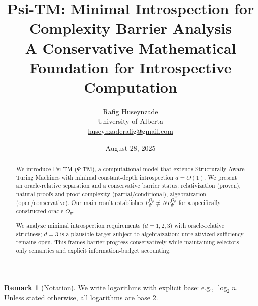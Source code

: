 \documentclass[11pt]{article}
\title{Psi-TM: Minimal Introspection for Complexity Barrier Analysis\\
\large{A Conservative Mathematical Foundation for Introspective Computation}}
\author{Rafig Huseynzade\\
University of Alberta\\
\href{mailto:huseynzaderafig@gmail.com}{huseynzaderafig@gmail.com}}
\date{August 28, 2025}
\theoremstyle{plain}
\theoremstyle{definition}
\newtheorem{remark}[theorem]{Remark}
\begin{document}
\maketitle

\begin{abstract}
We introduce Psi-TM ($\Psi$-TM), a computational model that extends Structurally-Aware Turing Machines with minimal constant-depth introspection $d = O(1)$. We present an oracle-relative separation and a conservative barrier status: relativization (proven), natural proofs and proof complexity (partial/conditional), algebraization (open/conservative). Our main result establishes $P^{O_{\Psi}}_{\Psi} \neq NP^{O_{\Psi}}_{\Psi}$ for a specifically constructed oracle $O_{\Psi}$.

We analyze minimal introspection requirements ($d=1,2,3$) with oracle-relative strictness; $d=3$ is a plausible target subject to algebraization; unrelativized sufficiency remains open. This frames barrier progress conservatively while maintaining selectors-only semantics and explicit information-budget accounting.
\end{abstract}

\tableofcontents
\newpage

\begin{remark}[Notation]
We write logarithms with explicit base: e.g., $\log_{2} n$. Unless stated otherwise, all logarithms are base 2.
\end{remark}





















\end{document}
